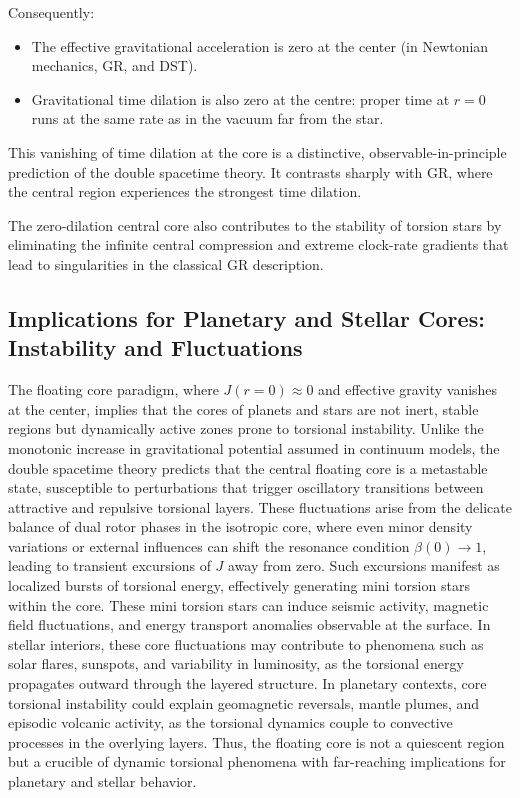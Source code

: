 \documentclass[dvipdfmx,a4paper]{article}
\begin{document}
Consequently:

\begin{itemize}
  \item The effective gravitational acceleration is zero at the center (in Newtonian mechanics, GR, and DST).
  \item Gravitational time dilation is also zero at the centre: proper time at \(r=0\) runs at the same rate as in the vacuum far from the star.
\end{itemize}

This vanishing of time dilation at the core is a distinctive, observable-in-principle prediction of the double spacetime theory. It contrasts sharply with GR, where the central region experiences the strongest time dilation.

The zero-dilation central core also contributes to the stability of torsion stars by eliminating the infinite central compression and extreme clock-rate gradients that lead to singularities in the classical GR description.

\subsection{Implications for Planetary and Stellar Cores: Instability and Fluctuations}

The floating core paradigm, where $J(r=0) \approx 0$ and effective gravity vanishes at the center, implies that the cores of planets and stars are not inert, stable regions but dynamically active zones prone to torsional instability. Unlike the monotonic increase in gravitational potential assumed in continuum models, the double spacetime theory predicts that the central floating core is a metastable state, susceptible to perturbations that trigger oscillatory transitions between attractive and repulsive torsional layers. These fluctuations arise from the delicate balance of dual rotor phases in the isotropic core, where even minor density variations or external influences can shift the resonance condition $\beta(0) \to 1$, leading to transient excursions of $J$ away from zero. Such excursions manifest as localized bursts of torsional energy, effectively generating mini torsion stars within the core. These mini torsion stars can induce seismic activity, magnetic field fluctuations, and energy transport anomalies observable at the surface. In stellar interiors, these core fluctuations may contribute to phenomena such as solar flares, sunspots, and variability in luminosity, as the torsional energy propagates outward through the layered structure. In planetary contexts, core torsional instability could explain geomagnetic reversals, mantle plumes, and episodic volcanic activity, as the torsional dynamics couple to convective processes in the overlying layers. Thus, the floating core is not a quiescent region but a crucible of dynamic torsional phenomena with far-reaching implications for planetary and stellar behavior.
\end{document}
